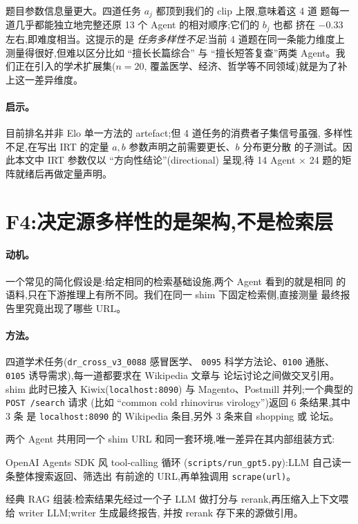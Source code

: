 \documentclass[UTF8,11pt]{ctexart}
\begin{document}
题目参数信息量更大。四道任务 $a_j$ 都顶到我们的 clip 上限,意味着这 4 道
题每一道几乎都能独立地完整还原 13 个 Agent 的相对顺序;它们的 $b_j$ 也都
挤在 $-0.33$ 左右,即难度相当。这提示的是 \emph{任务多样性不足}:当前
4 道题在同一条能力维度上测量得很好,但难以区分比如 “擅长长篇综合”
与 “擅长短答复查”两类 Agent。我们正在引入的学术扩展集($n = 20$,
覆盖医学、经济、哲学等不同领域)就是为了补上这一差异维度。

\paragraph{启示。}
目前排名并非 Elo 单一方法的 artefact;但 4 道任务的消费者子集信号虽强,
多样性不足,在写出 IRT 的定量 $a, b$ 参数声明之前需要更长、$b$ 分布更分散
的子测试。因此本文中 IRT 参数仅以 “方向性结论”(directional)
呈现,待 14 Agent $\times$ 24 题的矩阵就绪后再做定量声明。

\section{F4:决定源多样性的是架构,不是检索层}
\label{sec:sources}

\paragraph{动机。}
一个常见的简化假设是:给定相同的检索基础设施,两个 Agent 看到的就是相同
的语料,只在下游推理上有所不同。我们在同一 shim 下固定检索侧,直接测量
最终报告里究竟出现了哪些 URL。

\paragraph{方法。}
四道学术任务(\texttt{dr\_cross\_v3\_0088} 感冒医学、
\texttt{0095} 科学方法论、\texttt{0100} 通胀、
\texttt{0105} 诱导需求),每一道都要求在 Wikipedia 文章与
论坛讨论之间做交叉引用。shim 此时已接入 Kiwix(\texttt{localhost:8090})
与 Magento、Postmill 并列;一个典型的 \texttt{POST /search} 请求
(比如 “common cold rhinovirus virology”)返回 6 条结果,其中 3 条
是 \texttt{localhost:8090} 的 Wikipedia 条目,另外 3 条来自 shopping 或
论坛。

两个 Agent 共用同一个 shim URL 和同一套环境,唯一差异在其内部组装方式:
\begin{description}[leftmargin=2em,itemsep=2pt,labelsep=0.5em]
  \item[\texttt{gpt5chat}] OpenAI Agents SDK 风 tool-calling 循环
    (\texttt{scripts/run\_gpt5.py}):LLM 自己读一条整体搜索返回、筛选出
    有前途的 URL,再单独调用 \texttt{scrape(url)}。
  \item[\texttt{gpt-researcher}] 经典 RAG 组装:检索结果先经过一个子 LLM
    做打分与 rerank,再压缩入上下文喂给 writer LLM;writer 生成最终报告,
    并按 rerank 存下来的源做引用。
\end{description}
\end{document}
